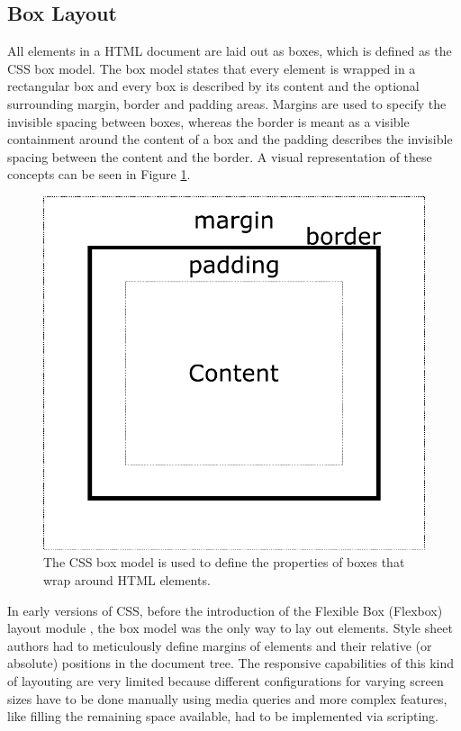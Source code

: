 \subsection{Box Layout}

All elements in a HTML document are laid out as boxes, which is defined as the CSS box model. The box model states that every element is wrapped in a rectangular box and every box is described by its content and the optional surrounding margin, border and padding areas. Margins are used to specify the invisible spacing between boxes, whereas the border is meant as a visible containment around the content of a box and the padding describes the invisible spacing between the content and the border. A visual representation of these concepts can be seen in Figure \ref{fig:BoxModel}.

\begin{figure}[tp]
    \centering
    \includegraphics[keepaspectratio,width=\linewidth,height=\fullh / 3]
    {diagrams/box-model.pdf}

    \caption[CSS Box Model]{
        The CSS box model is used to define the properties of boxes that wrap around HTML elements.
    }
    \label{fig:BoxModel}
\end{figure}

In early versions of CSS, before the introduction of the Flexible Box (Flexbox) layout module \parencite{CSSFlexboxFirstDraft}, the box model was the only way to lay out elements. Style sheet authors had to meticulously define margins of elements and their relative (or absolute) positions in the document tree. The responsive capabilities of this kind of layouting are very limited because different configurations for varying screen sizes have to be done manually using media queries and more complex features, like filling the remaining space available, had to be implemented via scripting.

